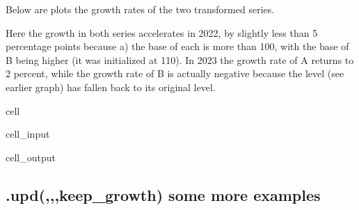 \documentclass[letterpaper,10pt,english]{jupyterBook}
\begin{document}
\sphinxAtStartPar
Below are plots the growth rates of the two transformed series.

\sphinxAtStartPar
Here the growth in both series accelerates in 2022, by slightly less than 5 percentage points because a) the base of each is more than 100, with the base of B being higher (it was initialized at 110). In 2023 the growth rate of A returns to 2 percent, while the growth rate of B is actually negative because the level (see earlier graph) has fallen back to its original level.

\begin{sphinxuseclass}{cell}\begin{sphinxVerbatimInput}

\begin{sphinxuseclass}{cell_input}
\begin{sphinxVerbatim}[commandchars=\\\{\}]
\PYG{p}{[}\PYG{p}{[}\PYG{p}{]}\PYG{p}{]}
\end{sphinxVerbatim}

\end{sphinxuseclass}\end{sphinxVerbatimInput}
\begin{sphinxVerbatimOutput}

\begin{sphinxuseclass}{cell_output}
\noindent{}

\end{sphinxuseclass}\end{sphinxVerbatimOutput}

\end{sphinxuseclass}

\subsection{.upd(,,,keep\_growth) some more examples}
\label{\detokenize{content/04_PythonEssentials/UpdateCommand:upd-keep-growth-some-more-examples}}
\end{document}
